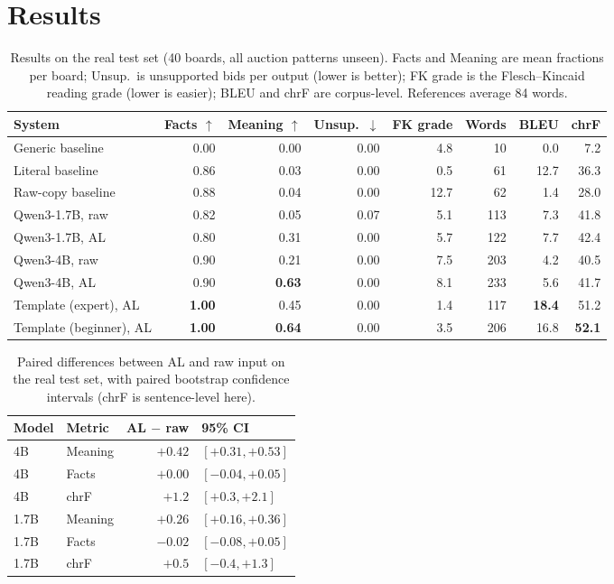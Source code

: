 \documentclass[11pt]{article}
\begin{document}
\section{Results}
\label{sec:results}

\begin{table}[t]
\centering
\small
\begin{tabular}{lrrrrrrr}
\toprule
System & Facts $\uparrow$ & Meaning $\uparrow$ & Unsup.\ $\downarrow$ & FK grade & Words & BLEU & chrF \\
\midrule
Generic baseline & 0.00 & 0.00 & 0.00 & 4.8 & 10 & 0.0 & 7.2 \\
Literal baseline & 0.86 & 0.03 & 0.00 & 0.5 & 61 & 12.7 & 36.3 \\
Raw-copy baseline & 0.88 & 0.04 & 0.00 & 12.7 & 62 & 1.4 & 28.0 \\
\midrule
Qwen3-1.7B, raw & 0.82 & 0.05 & 0.07 & 5.1 & 113 & 7.3 & 41.8 \\
Qwen3-1.7B, AL & 0.80 & 0.31 & 0.00 & 5.7 & 122 & 7.7 & 42.4 \\
Qwen3-4B, raw & 0.90 & 0.21 & 0.00 & 7.5 & 203 & 4.2 & 40.5 \\
Qwen3-4B, AL & 0.90 & \textbf{0.63} & 0.00 & 8.1 & 233 & 5.6 & 41.7 \\
\midrule
Template (expert), AL & \textbf{1.00} & 0.45 & 0.00 & 1.4 & 117 & \textbf{18.4} & 51.2 \\
Template (beginner), AL & \textbf{1.00} & \textbf{0.64} & 0.00 & 3.5 & 206 & 16.8 & \textbf{52.1} \\
\bottomrule
\end{tabular}
\caption{Results on the real test set (40 boards, all auction patterns unseen). Facts and Meaning are mean fractions per board; Unsup.\ is unsupported bids per output (lower is better); FK grade is the Flesch--Kincaid reading grade (lower is easier); BLEU and chrF are corpus-level. References average 84 words.}
\label{tab:real}
\end{table}

\begin{table}[t]
\centering
\small
\begin{tabular}{llrl}
\toprule
Model & Metric & AL $-$ raw & 95\% CI \\
\midrule
4B & Meaning & $+0.42$ & $[+0.31, +0.53]$ \\
4B & Facts & $+0.00$ & $[-0.04, +0.05]$ \\
4B & chrF & $+1.2$ & $[+0.3, +2.1]$ \\
1.7B & Meaning & $+0.26$ & $[+0.16, +0.36]$ \\
1.7B & Facts & $-0.02$ & $[-0.08, +0.05]$ \\
1.7B & chrF & $+0.5$ & $[-0.4, +1.3]$ \\
\bottomrule
\end{tabular}
\caption{Paired differences between AL and raw input on the real test set, with paired bootstrap confidence intervals (chrF is sentence-level here).}
\label{tab:boot}
\end{table}
\end{document}
